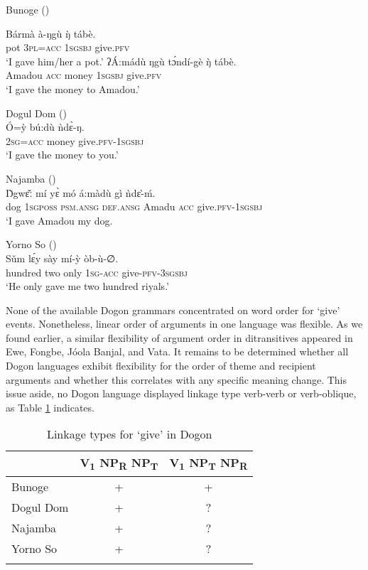 \documentclass[output=paper,colorlinks,citecolor=brown]{langscibook}
\begin{document}
\ea \label{ex:Dogon1} Bunoge (\cite[215, 324] {Heath2017a})
\begin{xlist}
\ex
\gll Bármà			à-ŋgù				ŋ̀						tábè.\\
						pot					3\textsc{pl=acc}		1\textsc{sgsbj}		give.\textsc{pfv} \\
\glt						‘I gave him/her a pot.’
\ex
\gll ʔÁ:mádù		ŋgù			tɔ́ndí-gè		ŋ̀						tábè.\\
						Amadou 	\textsc{acc} 		money			1\textsc{sgsbj}		give.\textsc{pfv}\\
\glt 						‘I gave the money to Amadou.’
\end{xlist}
\z

\ea \label{ex:Dogon2} Dogul Dom (\cite [186] {Heath2016}) \\
\gll Ó=ỳ					bú:dù			ǹdɛ̀-ŋ.\\
					2\textsc{sg=acc}	money		give.\textsc{pfv-1sgsbj}\\
\glt					‘I gave the money to you.’
\z

\ea \label{ex:Dogon3} Najamba (\citealt[245]{Heath2017c}) \\
\gll Ŋ̀gwɛ̌ː mí						yɛ̀							mó						á:màdù 	gì			ǹdɛ-̀ḿ.\\
				dog		\textsc{1sgposs}		\textsc{psm.ansg}		\textsc{def.ansg}		Amadu		\textsc{acc}		give.\textsc{pfv-1sgsbj}\\
\glt				‘I gave Amadou my dog.
\z

\ea \label{ex:Dogon4} Yorno So (\citealt[360]{Heath2017c}) \\
\gll Sǔm					lɛ́y			sày		mí-ỳ			òb-ù-∅.\\
				hundred		two		only		1\textsc{sg-acc}		give-\textsc{pfv-3sgsbj}\\
\glt				‘He only gave me two hundred riyals.’
\z

None of the available Dogon grammars concentrated on word order for ‘give’ events. Nonetheless, linear order of arguments in one language was flexible. As we found earlier, a similar flexibility of argument order in ditransitives appeared in Ewe, Fongbe, Jóola Banjal, and Vata. It remains to be determined whether all Dogon languages exhibit flexibility for the order of theme and recipient arguments and whether this correlates with any specific meaning change. This issue aside, no Dogon language displayed linkage type verb-verb or verb-oblique, as Table \ref{tab:LinkageDogon} indicates.

\begin{table}
\caption{Linkage types for ‘give’ in Dogon}
\label{tab:LinkageDogon}
 \begin{tabular}{lcc}
  \lsptoprule
 &  V\textsubscript{1} NP\textsubscript{R} NP\textsubscript{T}	&V\textsubscript{1} NP\textsubscript{T} NP\textsubscript{R} 	\\
  \midrule
Bunoge &	+ &	+\\
Dogul Dom &	+&?	\\
Najamba &+& ? \\
Yorno So &+&? \\
  \lspbottomrule
 \end{tabular}
\end{table}
\end{document}
